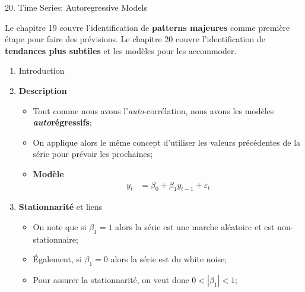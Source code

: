 \documentclass[12pt, titlepage, french]{report}
\begin{document}
\begin{CHPT_SUMM}[label = {timeseries20}]{20. Time Series: Autoregressive Models}
Le chapitre 19 couvre l'identification de \textbf{patterns majeures} comme première étape pour faire des prévisions. Le chapitre 20 couvre l'identification de \textbf{tendances plus subtiles} et les modèles pour les accommoder.

\begin{enumerate}
	\item	Introduction
	\item[]	\textbf{Description}
		\begin{itemize}
		\item	Tout comme nous avons l'\textit{auto}-corrélation, nous avons les modèles \textbf{\textit{auto}régressifs};
		\item[]	On applique alors le même concept d'utiliser les valeurs précédentes de la série pour prévoir les prochaines;
		\item	\textbf{Modèle}
		\begin{align*}
			y_{t}	&=	\beta_{0} + \beta_{1} y_{t - 1} + \varepsilon_{t}
		\end{align*}
		\end{itemize}
	\item[]	\textbf{Stationnarité} et liens
		\begin{itemize}
		\item	On note que si $\beta_{1} = 1$ alors la série est une marche aléatoire et est non-stationnaire;
		\item	Également, si $\beta_1 = 0$ alors la série est du white noise;
		\item	Pour assurer la stationnarité, on veut donc $0 < |\beta_{1}| < 1$;


\end{itemize}
\end{enumerate}
\end{CHPT_SUMM}
\end{document}

